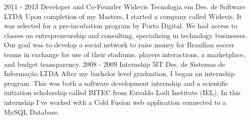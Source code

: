     {}
\cvevent
    {2011 - 2013}
    {Developer and Co-Founder}
    {Widevis Tecnologia em Des. de Software LTDA}
    {Upon completion of my Masters, I started a company called Widevis. It was selected for a pre-incubation program by Porto Digital. We had access to classes on entrepreneurship and consulting, specializing in technology businesses. Our goal was to develop a social network to raise money for Brazilian soccer teams in exchange for use of their stadiums, players interactions, a marketplace, and budget transparency.}
    {}
    {}
    {}
\cvevent
    {2008 - 2009}
    {Internship}
    {5IT Des. de Sistemas de Informação LTDA}
    {After my bachelor level graduation, I began an internship program. This was both a software development internship and a scientific initiation scholarship called BITEC from Euvaldo Lodi Institute (IEL). In this internship I’ve worked with a Cold Fusion web application connected to a MySQL Database.}
    {}
    {}
    {}
